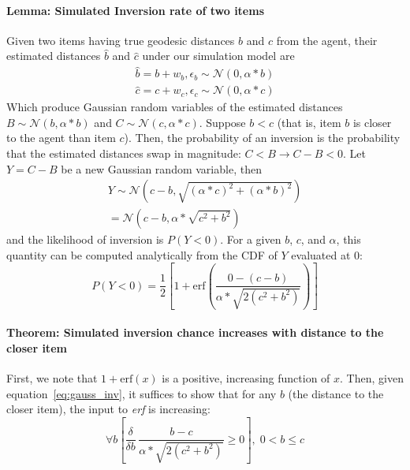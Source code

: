 \documentclass[aps,pre,groupedaddress]{revtex4-2}
\begin{document}
\paragraph{\textbf{Lemma:} Simulated Inversion rate of two items}
Given two items having true geodesic distances $b$ and $c$ from the agent, their estimated distances $\hat{b}$ and $\hat{c}$ under our simulation model are
\begin{equation}
\begin{split}
\hat{b} = b + w_{b}, \epsilon_{b} \sim \mathcal{N}(0,\alpha*b)\\
\hat{c} = c + w_{c}, \epsilon_{c} \sim \mathcal{N}(0,\alpha*c) 
\end{split}
\end{equation}
Which produce Gaussian random variables of the estimated distances $B \sim \mathcal{N}(b,\alpha*b) $ and $C \sim \mathcal{N}(c,\alpha*c)$.  Suppose $b < c$ (that is, item $b$ is closer to the agent than item $c$). Then, the probability of an inversion is the probability that the estimated distances swap in magnitude: $C < B \rightarrow C - B < 0$. Let $Y = C - B$ be a new Gaussian random variable, then 
\begin{equation}
\begin{split}
Y \sim \mathcal{N}(c-b, \sqrt{(\alpha*c)^2 + (\alpha*b)^2})\\
= \mathcal{N}(c-b, \alpha*\sqrt{c^2+b^2})
\end{split}
\end{equation}
and the likelihood of inversion is $P(Y < 0)$. For a given $b$, $c$, and $\alpha$, this quantity can be computed analytically from the CDF of $Y$ evaluated at $0$:
\begin{equation}
P(Y < 0) = \frac{1}{2} \left[ 1 + \text{erf}\left( \frac{0 - (c - b)}{\alpha*\sqrt{2(c^2+b^2)}} \right) \right] 
\label{eq:gauss_inv}
\end{equation}

\paragraph{\textbf{Theorem:} Simulated inversion chance increases with distance to the closer item}
First, we note that $1 + \text{erf}(x)$ is a positive, increasing function of $x$. Then, given equation~\ref{eq:gauss_inv}, it suffices to show that for any $b$ (the distance to the closer item), the input to \textit{erf} is increasing:
\begin{equation}
\forall b \left[ \frac{\delta}{\delta b}\, \frac{b - c }{\alpha*\sqrt{2(c^2+b^2)}} \geq 0\right] ,\;  0 < b \leq c
\label{eq:erf_inner}
\end{equation}
\end{document}
